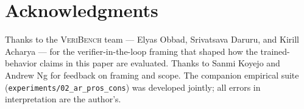 
\section*{Acknowledgments}

Thanks to the \textsc{VeriBench} team --- Elyas Obbad, Srivatsava Daruru, and Kirill Acharya --- for the verifier-in-the-loop framing that shaped how the trained-behavior claims in this paper are evaluated.
Thanks to Sanmi Koyejo and Andrew Ng for feedback on framing and scope.
The companion empirical suite (\texttt{experiments/02\_ar\_pros\_cons}) was developed jointly;
all errors in interpretation are the author's.
